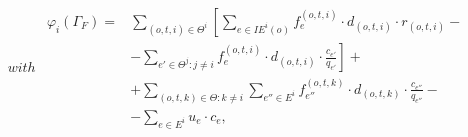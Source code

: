 \documentclass{article}
\begin{document}
\begin{subequations}
with 
    \begin{align}
        \begin{split}
        \varphi_i(\Gamma_F) = & \sum_{(o,t,i)\in \Theta^i} \left[ \sum_{e \in IE^i(o)} f_e^{(o,t,i)} \cdot d_{(o,t,i)} \cdot r_{(o,t,i)} - \right. \\
                              & \left. - \sum_{e'\in \Theta^j \colon j\not = i} f_e^{(o,t,i)} \cdot d_{(o,t,i)} \cdot \frac{c_{e'}}{q_{e'}} \right] + \\
                              & + \sum_{(o,t,k) \in \Theta \colon k \not = i} \sum_{e'' \in E^i} f_{e''}^{(o,t,k)} \cdot d_{(o,t,k)} \cdot \frac{c_{e''}}{q_{e''}} -\\
                              & - \sum_{e \in E^i} u_e \cdot c_e,
        \end{split}
    \end{align}
    


\end{subequations}
\end{document}
